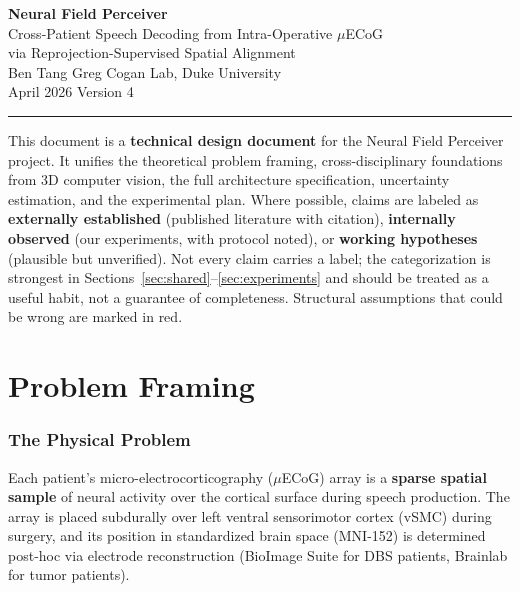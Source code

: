 \documentclass[11pt,letterpaper]{article}
\begin{document}
\begin{center}
{\LARGE\bfseries Neural Field Perceiver}\\[6pt]
{\large Cross-Patient Speech Decoding from Intra-Operative $\mu$ECoG\\via Reprojection-Supervised Spatial Alignment}\\[12pt]
{\normalsize Ben Tang \quad\textbar\quad Greg Cogan Lab, Duke University}\\[4pt]
{\normalsize April 2026 \quad\textbar\quad Version 4}
\end{center}

\medskip\noindent\rule{\textwidth}{0.4pt}\medskip

\noindent This document is a \textbf{technical design document} for the Neural Field Perceiver project.
It unifies the theoretical problem framing, cross-disciplinary foundations from 3D computer vision,
the full architecture specification, uncertainty estimation, and the experimental plan.
Where possible, claims are labeled as \textbf{externally established}
(published literature with citation), \textbf{internally observed} (our experiments, with protocol
noted), or \textbf{working hypotheses} (plausible but unverified). Not every claim carries a label;
the categorization is strongest in Sections~\ref{sec:shared}--\ref{sec:experiments} and should be
treated as a useful habit, not a guarantee of completeness.
Structural assumptions that could be wrong are marked in \textcolor{BrickRed}{red}.

\tableofcontents
\newpage



\part{Problem Framing}

\section{The Physical Problem}

Each patient's micro-electrocorticography ($\mu$ECoG) array is a \textbf{sparse spatial sample} of neural activity over the cortical surface during speech production. The array is placed subdurally over left ventral sensorimotor cortex (vSMC) during surgery, and its position in standardized brain space (MNI-152) is determined post-hoc via electrode reconstruction (BioImage Suite for DBS patients, Brainlab for tumor patients).
\end{document}
